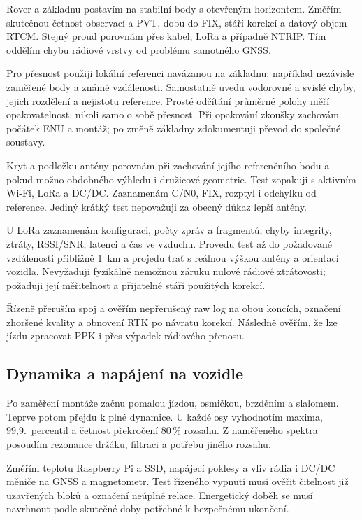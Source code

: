Rover a základnu postavím na stabilní body s otevřeným horizontem. Změřím
skutečnou četnost observací a PVT, dobu do FIX, stáří korekcí a datový objem
RTCM. Stejný proud porovnám přes kabel, LoRa a případně NTRIP. Tím oddělím
chybu rádiové vrstvy od problému samotného GNSS.

Pro přesnost použiji lokální referenci navázanou na základnu: například
nezávisle zaměřené body a známé vzdálenosti. Samostatně uvedu vodorovné
a svislé chyby, jejich rozdělení a nejistotu reference. Prosté odčítání
průměrné polohy měří opakovatelnost, nikoli samo o sobě přesnost.
Při opakování zkoušky zachovám počátek ENU a montáž; po změně základny
zdokumentuji převod do společné soustavy.

Kryt a podložku antény porovnám při zachování jejího referenčního bodu
a pokud možno obdobného výhledu i družicové geometrie. Test zopakuji
s aktivním Wi-Fi, LoRa a DC/DC. Zaznamenám C/N0, FIX, rozptyl i odchylku
od reference. Jediný krátký test nepovažuji za obecný důkaz lepší antény.

U LoRa zaznamenám konfiguraci, počty zpráv a fragmentů, chyby integrity,
ztráty, RSSI/SNR, latenci a čas ve vzduchu. Provedu test až do požadované
vzdálenosti přibližně \SI{1}{km} a projedu trať s reálnou výškou antény
a orientací vozidla. Nevyžaduji fyzikálně nemožnou záruku nulové rádiové
ztrátovosti; požaduji její měřitelnost a přijatelné stáří použitých korekcí.

Řízeně přeruším spoj a ověřím nepřerušený raw log na obou koncích, označení
zhoršené kvality a obnovení RTK po návratu korekcí. Následně ověřím, že lze
jízdu zpracovat PPK i přes výpadek rádiového přenosu.

\subsection{Dynamika a napájení na vozidle}

Po zaměření montáže začnu pomalou jízdou, osmičkou, brzděním a slalomem.
Teprve potom přejdu k plné dynamice. U každé osy vyhodnotím maxima,
99,9.~percentil a četnost překročení 80\,\% rozsahu. Z naměřeného spektra
posoudím rezonance držáku, filtraci a potřebu jiného rozsahu.

Změřím teplotu Raspberry Pi a SSD, napájecí poklesy a vliv rádia i DC/DC
měniče na GNSS a magnetometr. Test řízeného vypnutí musí ověřit čitelnost
již uzavřených bloků a označení neúplné relace. Energetický doběh se musí
navrhnout podle skutečné doby potřebné k bezpečnému ukončení.

